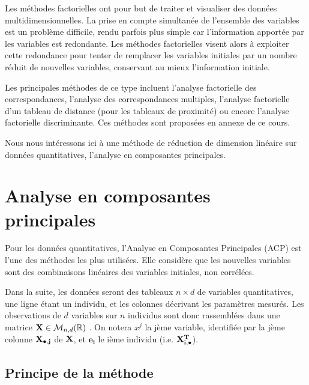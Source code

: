 \documentclass[letterpaper,10pt,english]{jupyterBook}
\begin{document}
\sphinxAtStartPar
Les méthodes factorielles ont pour but de traiter et visualiser des données multidimensionnelles. La prise en compte simultanée de l’ensemble des variables est un problème difficile, rendu parfois plus simple car l’information apportée par les variables est redondante. Les méthodes factorielles visent alors à exploiter cette redondance pour tenter de remplacer les variables initiales par un nombre réduit de nouvelles variables, conservant au mieux l’information initiale.

\sphinxAtStartPar
Les principales méthodes de ce type incluent l’analyse factorielle des correspondances, l’analyse des correspondances multiples, l’analyse factorielle d’un tableau de distance (pour les tableaux de proximité) ou encore l’analyse factorielle discriminante. Ces méthodes sont proposées en annexe de ce cours.

\sphinxAtStartPar
Nous nous intéressons ici à une méthode de réduction de dimension linéaire sur données quantitatives, l’analyse en composantes principales.


\chapter{Analyse en composantes principales}
\label{\detokenize{acp:analyse-en-composantes-principales}}\label{\detokenize{acp::doc}}
\ignorespaces 
{}\ignorespaces 
\sphinxAtStartPar
Pour les données quantitatives, l’Analyse en Composantes Principales (ACP) est l’une des méthodes les plus utilisées. Elle considère que les nouvelles variables sont des combinaisons linéaires des variables initiales, non corrélées.

\sphinxAtStartPar
{}

\sphinxAtStartPar
Dans la suite, les données seront des tableaux \(n\times d\) de variables quantitatives, une ligne étant un individu, et les colonnes décrivant les paramètres mesurés. Les observations de \(d\) variables sur \(n\) individus sont donc rassemblées dans une matrice \({\bf X}\in\mathcal{M}_{n,d}(\mathbb{R})\) .  On notera \(x^j\) la j\sphinxhyphen{}ème variable, identifiée par la j\sphinxhyphen{}ème colonne \({\bf X_{\bullet,j}}\) de \({\bf X}\), et \(\mathbf{e_i}\) le i\sphinxhyphen{}ème individu (i.e. \({\bf X_{i,\bullet}^T}\)).


\section{Principe de la méthode}
\label{\detokenize{acp:principe-de-la-methode}}
\end{document}
